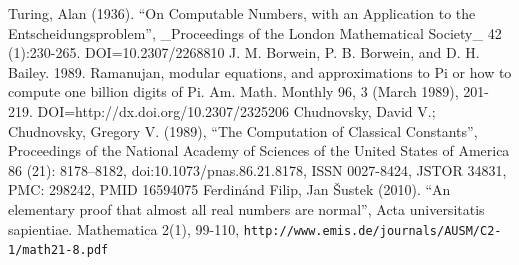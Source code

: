 \documentclass[10pt]{article}
\begin{document}
\pagebreak
\begin{thebibliography}{9}
Turing, Alan (1936). ``On Computable Numbers, with an Application to the Entscheidungsproblem'', \_Proceedings of the London Mathematical Society\_ 42 (1):230-265. DOI=10.2307/2268810
J. M. Borwein, P. B. Borwein, and D. H. Bailey. 1989. Ramanujan, modular equations, and approximations to Pi or how to compute one billion digits of Pi. Am. Math. Monthly 96, 3 (March 1989), 201-219. DOI=http://dx.doi.org/10.2307/2325206
 Chudnovsky, David V.; Chudnovsky, Gregory V. (1989), ``The Computation of Classical Constants'', Proceedings of the National Academy of Sciences of the United States of America 86 (21): 8178–8182, doi:10.1073/pnas.86.21.8178, ISSN 0027-8424, JSTOR 34831, PMC: 298242, PMID 16594075
Ferdinánd Filip, Jan Šustek (2010). ``An elementary proof that almost all real numbers are normal'', Acta universitatis sapientiae. Mathematica 2(1), 99-110, \texttt{http://www.emis.de/journals/AUSM/C2-1/math21-8.pdf}
\end{thebibliography}
\end{document}
